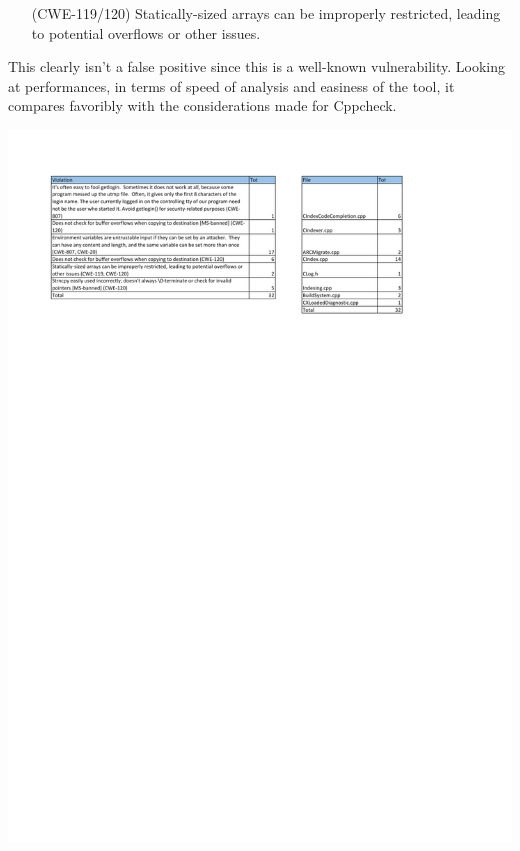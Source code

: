 \begin{itemize}
	\item[(CWE-119/120) ] Statically-sized arrays can be improperly restricted, leading to potential overflows or other issues.
\end{itemize}

This clearly isn't a false positive since this is a well-known vulnerability.\newline\newline
Looking at performances, in terms of speed of analysis and easiness of the tool, it compares favoribly with the considerations made for Cppcheck.

\pagebreak

\begin{minipage}{\linewidth}
	\includegraphics[width=\textwidth]{pdf/Flawfinder_Summary.pdf}
\end{minipage}

